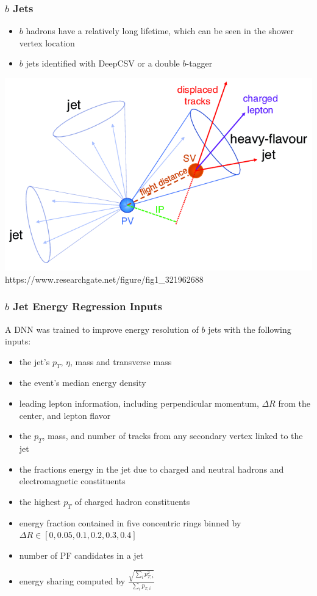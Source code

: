 \documentclass{beamer}
\begin{document}
\begin{frame}
  \frametitle{$b$ Jets}

  \begin{itemize}
  \item $b$ hadrons have a relatively long lifetime, which can be seen in the shower vertex location
  \item $b$ jets identified with DeepCSV or a double $b$-tagger
  \end{itemize}

  \centering
  \includegraphics[width=0.8\linewidth]{figures/Illustration-of-a-heavy-flavour-jet-with-a-secondary-vertex-SV-from-the-decay-of-a-b-or.png}
  \tiny{https://www.researchgate.net/figure/fig1\_321962688}

\end{frame}

\begin{frame}
  \frametitle{$b$ Jet Energy Regression Inputs}

  A DNN was trained to improve energy resolution of $b$ jets with the following inputs:

  \begin{itemize}
  \item the jet's $p_T$, $\eta$, mass and transverse mass
  \item the event's median energy density
  \item leading lepton information,
    including perpendicular momentum,
    $\Delta R$ from the center,
    and lepton flavor
  \item the $p_T$, mass, and number of tracks from any secondary vertex linked to the jet
  \item the fractions energy in the jet due to
    charged and neutral hadrons and electromagnetic constituents
  \item the highest $p_T$ of charged hadron constituents
  \item energy fraction contained in five concentric rings
    binned by $\Delta R \in [0, 0.05, 0.1, 0.2, 0.3, 0.4]$
  \item number of PF candidates in a jet
  \item energy sharing computed by
    $\frac{\sqrt{\sum_i p_{T,i}^2}}{\sum_i p_{T,i}}$
  \end{itemize}

\end{frame}
\end{document}
